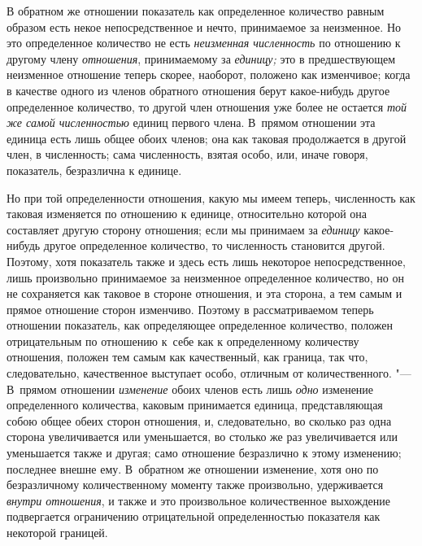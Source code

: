 В обратном же отношении показатель как определенное количество равным образом
есть некое непосредственное и нечто, принимаемое за неизменное. Но это
определенное количество не есть {\em неизменная численность }по отношению к
другому члену {\em отношения}, принимаемому за {\em единицу;} это в
предшествующем неизменное отношение теперь скорее, наоборот, положено как
изменчивое; когда в качестве одного из членов обратного отношения берут
какое-нибудь другое определенное количество, то другой член отношения уже более
не остается {\em той же самой численностью} единиц первого члена. В~прямом
отношении эта единица есть лишь общее обоих членов; она как таковая
продолжается в другой член, в численность; сама численность, взятая особо, или,
иначе говоря, показатель, безразлична к единице.

Но при той определенности отношения, какую мы имеем теперь, численность как
таковая изменяется по отношению к единице, относительно которой она составляет
другую сторону отношения; если мы принимаем за {\em единицу} какое-нибудь
другое определенное количество, то численность становится другой. Поэтому, хотя
показатель также и здесь есть лишь некоторое непосредственное, лишь произвольно
принимаемое за неизменное определенное количество, но он не сохраняется как
таковое в стороне отношения, и эта сторона, а тем самым и прямое отношение
сторон изменчиво. Поэтому в рассматриваемом теперь отношении показатель, как
определяющее определенное количество, положен отрицательным по отношению к~себе
как к определенному количеству отношения, положен тем самым как качественный,
как граница, так что, следовательно, качественное выступает особо, отличным от
количественного. "--- В~прямом отношении {\em изменение} обоих членов есть лишь
{\em одно} изменение определенного количества, каковым принимается единица,
представляющая собою общее обеих сторон отношения, и, следовательно, во сколько
раз одна сторона увеличивается или уменьшается, во столько же раз увеличивается
или уменьшается также и другая; само отношение безразлично к этому изменению;
последнее внешне ему. В~обратном же отношении изменение, хотя оно по
безразличному количественному моменту также произвольно, удерживается
{\em внутри отношения}, и также и это произвольное количественное выхождение
подвергается ограничению отрицательной определенностью показателя как
некоторой границей.

